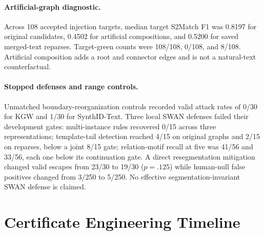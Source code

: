 \documentclass[10pt]{article}
\begin{document}
\paragraph{Artificial-graph diagnostic.}
Across 108 accepted injection targets, median target S2Match F1 was 0.8197
for original candidates, 0.4502 for artificial compositions, and 0.5200 for
saved merged-text reparses. Target-green counts were 108/108, 0/108, and
8/108. Artificial composition adds a root and connector edges and is not a
natural-text counterfactual.

\paragraph{Stopped defenses and range controls.}
Unmatched boundary-reorganization controls recorded valid attack rates of
0/30 for KGW and 1/30 for SynthID-Text. Three local SWAN defenses failed
their development gates: multi-instance rules recovered 0/15 across three
representations; template-tail detection reached 4/15 on original graphs and
2/15 on reparses, below a joint 8/15 gate; relation-motif recall at five was
41/56 and 33/56, each one below its continuation gate. A direct
resegmentation mitigation changed valid escapes from 23/30 to 19/30
($p=.125$) while human-null false positives changed from 3/250 to 5/250.
No effective segmentation-invariant SWAN defense is claimed.

\section{Certificate Engineering Timeline}
\end{document}
